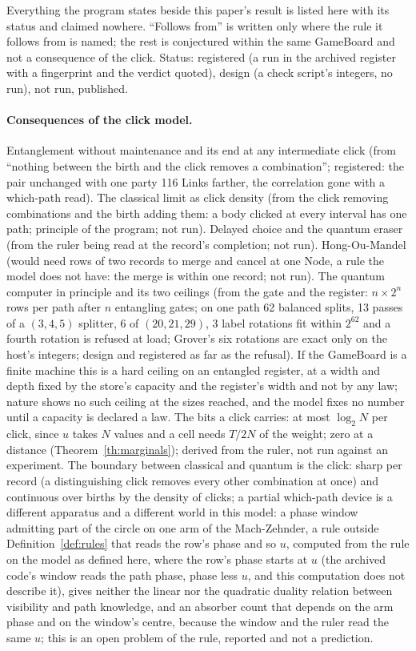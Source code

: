 \documentclass[11pt]{article}
\theoremstyle{definition}
\begin{document}
Everything the program states beside this paper's result is listed here
with its status and claimed nowhere. ``Follows from'' is written only
where the rule it follows from is named; the rest is conjectured within
the same GameBoard and not a consequence of the click. Status: registered
(a run in the archived register with a fingerprint and the verdict
quoted), design (a check script's integers, no run), not run, published.

\paragraph{Consequences of the click model.} Entanglement without
maintenance and its end at any intermediate click (from ``nothing between
the birth and the click removes a combination''; registered: the pair
unchanged with one party 116 Links farther, the correlation gone with a
which-path read). The classical limit as click density (from the click
removing combinations and the birth adding them: a body clicked at every
interval has one path; principle of the program; not run). Delayed
choice and the quantum eraser (from the ruler being read at the record's
completion; not run). Hong-Ou-Mandel (would need rows of two records to
merge and cancel at one Node, a rule the model does not have: the merge
is within one record; not run). The quantum computer in principle and its two ceilings (from
the gate and the register: $n \times 2^n$ rows per path after $n$
entangling gates; on one path 62 balanced splits, 13 passes of a
$(3, 4, 5)$ splitter, 6 of $(20, 21, 29)$, 3 label rotations fit within
$2^{62}$ and a fourth rotation is refused at load; Grover's six rotations
are exact only on the host's integers; design and registered as far as
the refusal). If the GameBoard is a finite machine this is a hard ceiling
on an entangled register, at a width and depth fixed by the store's
capacity and the register's width and not by any law; nature shows no
such ceiling at the sizes reached, and the model fixes no number until a
capacity is declared a law. The bits a click carries: at most $\log_2 N$
per click, since $u$ takes $N$ values and a cell needs $T/2N$ of the
weight; zero at a distance (Theorem~\ref{th:marginals}); derived from the
ruler, not run against an experiment. The boundary between classical and
quantum is the click: sharp per record (a distinguishing click removes
every other combination at once) and continuous over births by the
density of clicks; a partial which-path device is a different apparatus
and a different world in this model: a phase window admitting part of
the circle on one arm of the Mach-Zehnder, a rule outside
Definition~\ref{def:rules} that reads the row's phase and so $u$,
computed from the rule \cite{checks} on the model as defined here, where
the row's phase starts at $u$ (the archived code's window reads the path
phase, phase less $u$, and this computation does not describe it), gives
neither the linear nor the quadratic duality
relation between visibility and path knowledge, and an absorber count
that depends on the arm phase and on the window's centre, because the
window and the ruler read the same $u$; this is an open problem of the
rule, reported and not a prediction.
\end{document}
